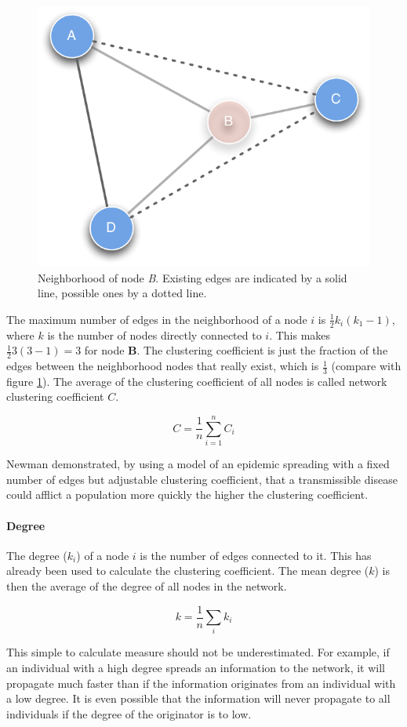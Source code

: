 \begin{figure}[htpb]
\begin{center}
  \includegraphics[width=.33\textwidth]{assets/pdf/clustering_coefficient.pdf}
  \caption[Neighborhood of node \textit{B}]{Neighborhood of node \textit{B}. Existing edges are indicated by a solid line, possible ones by a dotted line.}
  \label{fig:clust_coeff}
\end{center}
\end{figure}

The maximum number of edges in the neighborhood of a node $i$ is $\frac{1}{2}k_i(k_1 -1)$, where $k$ is the number of nodes directly connected to $i$. This makes $\frac{1}{2}3(3 -1) = 3$ for node \textbf{B}. The clustering coefficient is just the fraction of the edges between the neighborhood nodes that really exist, which is $\frac{1}{3}$ (compare with figure \ref{fig:clust_coeff}). The average of the clustering coefficient of all nodes is called network clustering coefficient $C$.

\begin{equation}
C = \frac{1}{n}\sum^n_{i=1}C_i
\end{equation}  

Newman\cite{newman:2003} demonstrated, by using a model of an epidemic spreading with a fixed number of edges but adjustable clustering coefficient, that a transmissible disease could afflict a population more quickly the higher the clustering coefficient.
     
\paragraph{Degree}

The degree ($k_i$) of a node $i$ is the number of edges connected to it. This has already been used to calculate the clustering coefficient. The mean degree ($k$) is then the average of the degree of all nodes in the network.

\begin{equation}
k = \frac{1}{n}\sum_i k_i
\end{equation}

This simple to calculate measure should not be underestimated. For example, if an individual with a high degree spreads an information to the network, it will propagate much faster than if the information originates from an individual with a low degree. It is even possible that the information will never propagate to all individuals if the degree of the originator is to low.

